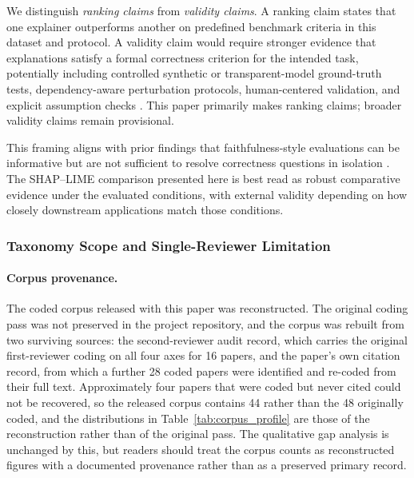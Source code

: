 \documentclass[fleqn,10pt,lineno]{wlpeerj}
\begin{document}
We distinguish \emph{ranking claims} from \emph{validity claims}. A
ranking claim states that one explainer outperforms another on predefined
benchmark criteria in this dataset and protocol. A validity claim would
require stronger evidence that explanations satisfy a formal correctness
criterion for the intended task, potentially including controlled
synthetic or transparent-model ground-truth tests, dependency-aware
perturbation protocols, human-centered validation, and explicit assumption checks
\citep{haufe2026formalization,doshivelez2017rigorous}. This paper
primarily makes ranking claims; broader validity claims remain provisional.

This framing aligns with prior findings that faithfulness-style evaluations
can be informative but are not sufficient to resolve correctness questions
in isolation \citep{jacovi2020faithfulness,adebayo2018sanity,
hooker2019benchmark,rong2022consistent}. The SHAP--LIME comparison
presented here is best read as robust comparative evidence under the
evaluated conditions, with external validity depending on how closely
downstream applications match those conditions.

\subsubsection{Taxonomy Scope and Single-Reviewer Limitation}

\paragraph{Corpus provenance.} The coded corpus released with this paper was
reconstructed. The original coding pass was not preserved in the project
repository, and the corpus was rebuilt from two surviving sources: the
second-reviewer audit record, which carries the original first-reviewer coding
on all four axes for 16 papers, and the paper's own citation record, from which
a further 28 coded papers were identified and re-coded from their full text.
Approximately four papers that were coded but never cited could not be
recovered, so the released corpus contains 44 rather than the 48 originally
coded, and the distributions in Table~\ref{tab:corpus_profile} are those of the
reconstruction rather than of the original pass. The qualitative gap analysis is
unchanged by this, but readers should treat the corpus counts as reconstructed
figures with a documented provenance rather than as a preserved primary record.
\end{document}
